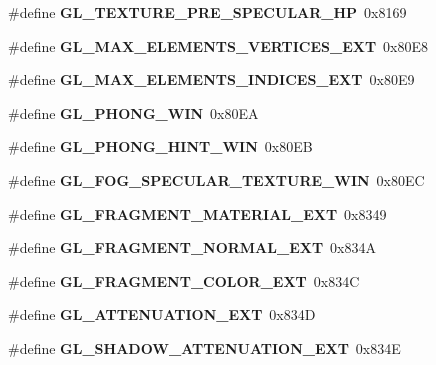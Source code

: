 \begin{DoxyCompactItemize}
\item 
\#define {\bfseries G\+L\+\_\+\+T\+E\+X\+T\+U\+R\+E\+\_\+\+P\+R\+E\+\_\+\+S\+P\+E\+C\+U\+L\+A\+R\+\_\+\+H\+P}~0x8169\label{_s_d_l__opengl_8h_ab66441c341131a8e274cb22547825eed}

\item 
\#define {\bfseries G\+L\+\_\+\+M\+A\+X\+\_\+\+E\+L\+E\+M\+E\+N\+T\+S\+\_\+\+V\+E\+R\+T\+I\+C\+E\+S\+\_\+\+E\+X\+T}~0x80\+E8\label{_s_d_l__opengl_8h_ab9cf7464e72d5a7ad2553e50a251bedf}

\item 
\#define {\bfseries G\+L\+\_\+\+M\+A\+X\+\_\+\+E\+L\+E\+M\+E\+N\+T\+S\+\_\+\+I\+N\+D\+I\+C\+E\+S\+\_\+\+E\+X\+T}~0x80\+E9\label{_s_d_l__opengl_8h_a1ee1747aec733cb655d389172ac134f4}

\item 
\#define {\bfseries G\+L\+\_\+\+P\+H\+O\+N\+G\+\_\+\+W\+I\+N}~0x80\+E\+A\label{_s_d_l__opengl_8h_a082750ee8782dd8d7a0059731f4aa4ec}

\item 
\#define {\bfseries G\+L\+\_\+\+P\+H\+O\+N\+G\+\_\+\+H\+I\+N\+T\+\_\+\+W\+I\+N}~0x80\+E\+B\label{_s_d_l__opengl_8h_a266651c0aabb70ec79c89900f98a7b15}

\item 
\#define {\bfseries G\+L\+\_\+\+F\+O\+G\+\_\+\+S\+P\+E\+C\+U\+L\+A\+R\+\_\+\+T\+E\+X\+T\+U\+R\+E\+\_\+\+W\+I\+N}~0x80\+E\+C\label{_s_d_l__opengl_8h_a784412d4a0340e0b215809aaded4ed92}

\item 
\#define {\bfseries G\+L\+\_\+\+F\+R\+A\+G\+M\+E\+N\+T\+\_\+\+M\+A\+T\+E\+R\+I\+A\+L\+\_\+\+E\+X\+T}~0x8349\label{_s_d_l__opengl_8h_aa3e080bdfb1e68121887caf358cc1c19}

\item 
\#define {\bfseries G\+L\+\_\+\+F\+R\+A\+G\+M\+E\+N\+T\+\_\+\+N\+O\+R\+M\+A\+L\+\_\+\+E\+X\+T}~0x834\+A\label{_s_d_l__opengl_8h_a5a8e1b6ba9a8a6c19acd22c6f351780e}

\item 
\#define {\bfseries G\+L\+\_\+\+F\+R\+A\+G\+M\+E\+N\+T\+\_\+\+C\+O\+L\+O\+R\+\_\+\+E\+X\+T}~0x834\+C\label{_s_d_l__opengl_8h_adc43e787c5815fc88a7a687b223ffd75}

\item 
\#define {\bfseries G\+L\+\_\+\+A\+T\+T\+E\+N\+U\+A\+T\+I\+O\+N\+\_\+\+E\+X\+T}~0x834\+D\label{_s_d_l__opengl_8h_a7cd0e84405a119805cb2677c1123d631}

\item 
\#define {\bfseries G\+L\+\_\+\+S\+H\+A\+D\+O\+W\+\_\+\+A\+T\+T\+E\+N\+U\+A\+T\+I\+O\+N\+\_\+\+E\+X\+T}~0x834\+E\label{_s_d_l__opengl_8h_a6888682f836607310c8f192bd95ae31e}


\end{DoxyCompactItemize}
